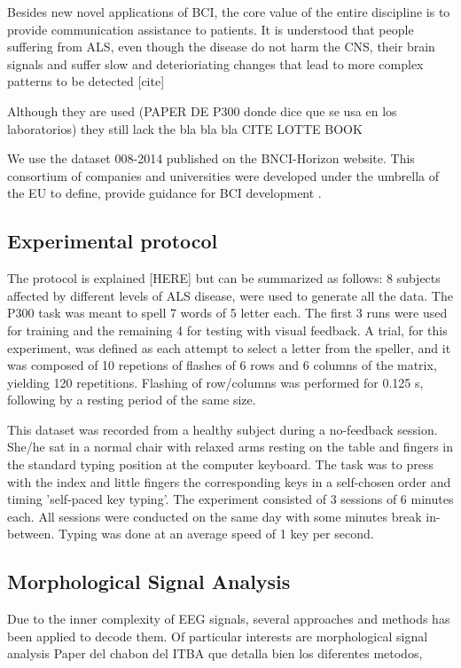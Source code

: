 \documentclass[entropy,article,submit,moreauthors,pdftex,10pt,a4paper]{mdpi}
\begin{document}
Besides new novel applications of BCI, the core value of the entire discipline is to provide communication assistance to patients.  It is understood that people suffering from ALS, even though the disease do not harm the CNS, their brain signals and suffer slow and deterioriating changes that lead to more complex patterns to be detected [cite]

Although they are used (PAPER DE P300 donde dice que se usa en los laboratorios) they still lack the bla bla bla CITE LOTTE BOOK \citep{Huggins2016}

We use the dataset 008-2014 published on the BNCI-Horizon website.  This consortium of companies and universities were developed under the umbrella of the EU to define, provide guidance for BCI development \citep{Riccio2013}.

\subsection{Experimental protocol}

The protocol is explained [HERE] but can be summarized as follows:  8 subjects affected by different levels of ALS disease, were used to generate all the data. The P300 task was meant to spell 7 words of 5 letter each.  The first 3 runs were used for training and the remaining 4 for testing with visual feedback.  A trial, for this experiment, was defined as each attempt to select a letter from the speller, and it was composed of 10 repetions of flashes of 6 rows and 6 columns of the matrix, yielding 120 repetitions.  Flashing of row/columns was performed for 0.125 s, following by a resting period of the same size.

This dataset was recorded from a healthy subject during a no-feedback session. She/he sat in a normal chair with relaxed arms resting on the table and fingers in the standard typing position at the computer keyboard. The task was to press with the index and little fingers the corresponding keys in a self-chosen order and timing 'self-paced key typing'. The experiment consisted of 3 sessions of 6 minutes each. All sessions were conducted on the same day with some minutes break in-between. Typing was done at an average speed of 1 key per second.  

\subsection{Morphological Signal Analysis}

Due to the inner complexity of EEG signals, several approaches and methods has been applied to decode them.  Of particular interests are morphological signal analysis 
Paper del chabon del ITBA que detalla bien los diferentes metodos, 
\end{document}
